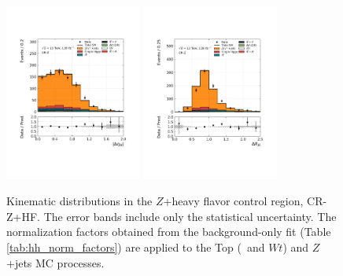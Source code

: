 \begin{figure}[!htb]
    \includegraphics[width=0.4\textwidth]{figures/search_hh/bkg_estimate/crvr/crzhf/crztest_deta_ll}
    \includegraphics[width=0.4\textwidth]{figures/search_hh/bkg_estimate/crvr/crzhf/crztest_dRll}
    \caption{
    Kinematic distributions in the $Z$+heavy flavor control region, CR-Z+HF.
    The error bands include only the statistical uncertainty.
    The normalization factors obtained from the background-only fit (Table \ref{tab:hh_norm_factors}) are applied
    to the Top (\ttbar~and $Wt$) and $Z$+jets MC processes.
    }
    \label{fig:crz_kin_plots_0}
\end{figure}

